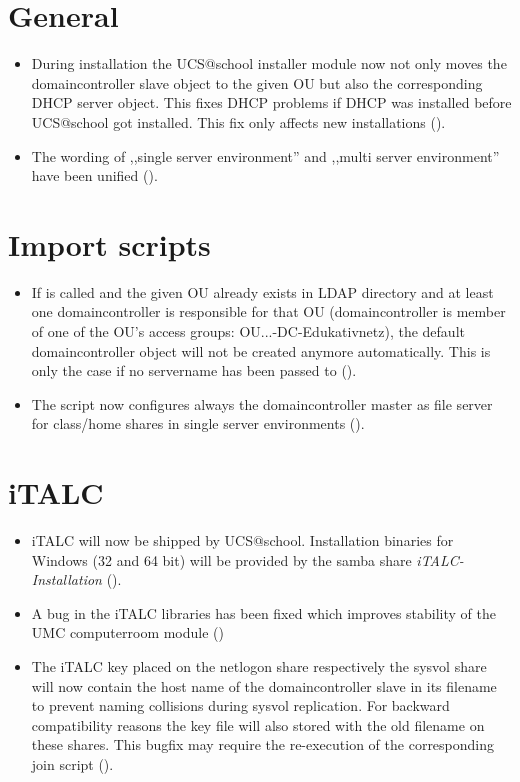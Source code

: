 \section{General}
\begin{itemize}
\item During installation the UCS@school installer module now not only moves the domaincontroller slave object
  to the given OU but also the corresponding DHCP server object. This fixes DHCP problems if DHCP was
  installed before UCS@school got installed. This fix only affects new installations ().
\item The wording of ,,single server environment'' and ,,multi server environment'' have been unified ().
\end{itemize}

\section{Import scripts}
\begin{itemize}
\item If  is called and the given OU already exists in LDAP directory and at least one
  domaincontroller is responsible for that OU (domaincontroller is member of one of the OU's access groups:
  OU...-DC-Edukativnetz), the default domaincontroller object will not be created anymore automatically. This
  is only the case if no servername has been passed to  ().
\item The script  now configures always the domaincontroller master as file server for
      class/home shares in single server environments ().
\end{itemize}
 
\section{iTALC}
\begin{itemize}
\item iTALC will now be shipped by UCS@school. Installation binaries for Windows (32 and 64 bit) will be
  provided by the samba share \emph{iTALC-Installation} ().
\item A bug in the iTALC libraries has been fixed which improves stability of the UMC computerroom module ()
\item The iTALC key placed on the netlogon share respectively the sysvol share will now contain the host name
      of the domaincontroller slave in its filename to prevent naming collisions during sysvol replication. 
      For backward compatibility reasons the key file will also stored with the old filename on these shares. This
      bugfix may require the re-execution of the corresponding join script ().
\end{itemize}

